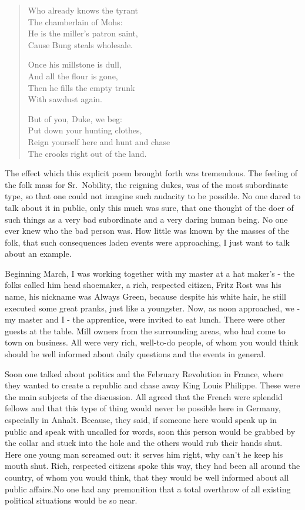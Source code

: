 \begin{quote}
Who already knows the tyrant\\
The chamberlain of Mohs:\\
He is the miller's patron saint,\\
Cause Bung steals wholesale.

Once his millstone is dull,\\
And all the flour is gone,\\
Then he fills the empty trunk\\
With sawdust again.

But of you, Duke, we beg:\\
Put down your hunting clothes,\\
Reign yourself here and hunt and chase\\
The crooks right out of the land.
\end{quote}

The effect which this explicit poem brought forth was tremendous. The feeling of the folk mass for Sr.~Nobility, the reigning dukes, was of the most subordinate type, so that one could not imagine such audacity to be possible. No one dared to talk about it in public, only this much was sure, that one thought of the doer of such things as a very bad subordinate and a very daring human being. No one ever knew who the bad person was. How little was known by the masses of the folk, that such consequences laden events were approaching, I just want to talk about an example.

Beginning March, I was working together with my master at a hat maker's - the folks called him head shoemaker, a rich, respected citizen, Fritz Rost was his name, his nickname was Always Green, because despite his white hair, he still executed some great pranks, just like a youngster. Now, as noon approached, we - my master and I - the apprentice, were invited to eat lunch. There were other guests at the table. Mill owners from the surrounding areas, who had come to town on business. All were very rich, well-to-do people, of whom you would think should be well informed about daily questions and the events in general.

Soon one talked about politics and the February Revolution in France, where they wanted to create a republic and chase away King Louis Philippe. These were the main subjects of the discussion. All agreed that the French were splendid fellows and that this type of thing would never be possible here in Germany, especially in Anhalt. Because, they said, if someone here would speak up in public and speak with uncalled for words, soon this person would be grabbed by the collar and stuck into the hole and the others would rub their hands shut. Here one young man screamed out: it serves him right, why can't he keep his mouth shut. Rich, respected citizens spoke this way, they had been all around the country, of whom you would think, that they would be well informed about all public affairs.No one had any premonition that a total overthrow of all existing political situations would be so near.

